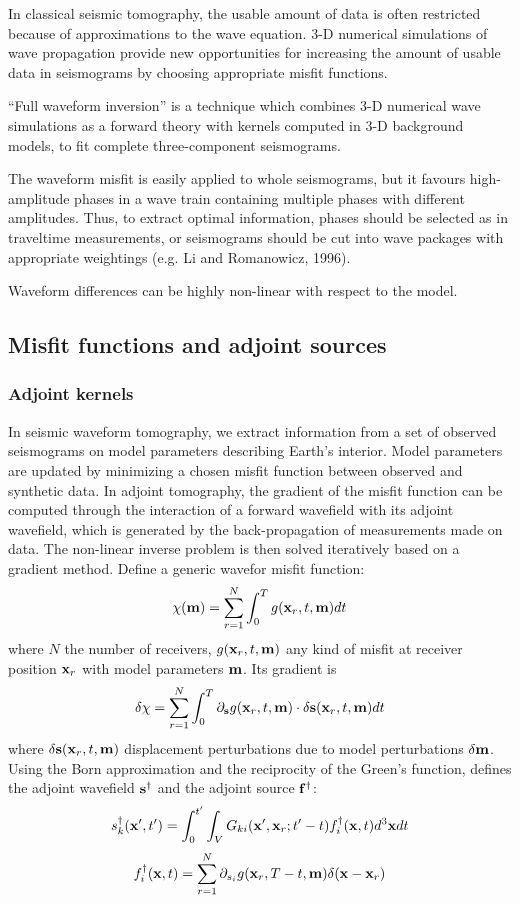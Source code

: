  In classical seismic tomography, the usable amount of data is often restricted
because of approximations to the wave equation.
3-D numerical simulations of wave propagation provide new opportunities for increasing
the amount of usable data in seismograms by choosing appropriate misfit functions.

 ``Full waveform inversion'' is a technique
which combines 3-D numerical wave simulations as a forward theory
with \Frechet kernels computed in 3-D background models,
to fit complete three-component seismograms.

 The waveform misfit is easily applied to whole seismograms,
but it favours high-amplitude phases in a wave train
containing multiple phases with different amplitudes.
Thus, to extract optimal information, phases should be selected as in traveltime measurements,
or seismograms should be cut into wave packages with appropriate weightings
(e.g. Li and Romanowicz, 1996).

Waveform differences can be highly non-linear with respect to the model.

\subsection{Misfit functions and adjoint sources}
\subsubsection{Adjoint kernels}
 In seismic waveform tomography, we extract information from
a set of observed seismograms on model parameters describing Earth's interior.
Model parameters are updated by minimizing a chosen misfit function
between observed and synthetic data.
In adjoint tomography, the gradient of the misfit function can be computed
through the interaction of a forward wavefield with its adjoint wavefield,
which is generated by the back-propagation of measurements made on data.
The non-linear inverse problem is then solved iteratively based on a gradient method.
Define a generic wavefor misfit function:
\[ \chi(\mathbf{m})=\sum_{r=1}^N\int_0^Tg(\mathbf{x}_r,t,\mathbf{m})dt \]
where $N$ the number of receivers, $g(\mathbf{x}_r,t,\mathbf{m})$ any kind of misfit
at receiver position $\mathbf{x}_r$ with model parameters $\mathbf{m}$.
Its gradient is
\[ \delta\chi=\sum_{r=1}^N\int_0^T\partial_{\mathbf{s}}g(\mathbf{x}_r,t,\mathbf{m})\cdot\delta\mathbf{s}(\mathbf{x}_r,t,\mathbf{m})dt \]
where $\delta\mathbf{s}(\mathbf{x}_r,t,\mathbf{m})$ displacement perturbations
due to model perturbations $\delta\mathbf{m}$.
Using the Born approximation and the reciprocity of the Green's function,
defines the adjoint wavefield $\mathbf{s}^\dagger$ and the adjoint source $\mathbf{f}^\dagger$:
\[ s_k^\dagger(\mathbf{x}',t')=\int_0^{t'}\int_VG_{ki}(\mathbf{x}',\mathbf{x}_r;t'-t)f_i^\dagger(\mathbf{x},t)d^3\mathbf{x}dt \]
\[ f_i^\dagger(\mathbf{x},t)=\sum_{r=1}^N\partial_{s_i}g(\mathbf{x}_r,T-t,\mathbf{m})\delta(\mathbf{x}-\mathbf{x}_r) \]

